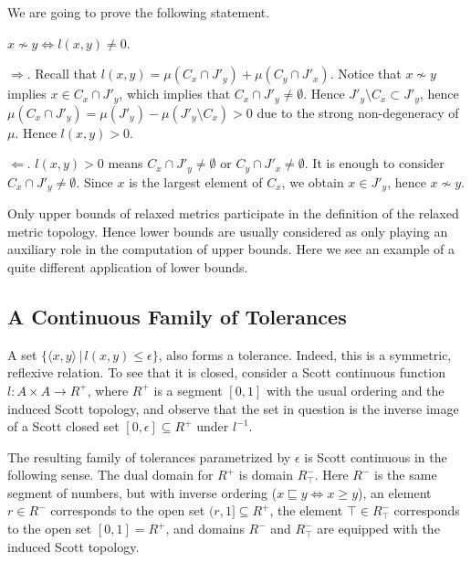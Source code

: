 We are going to prove the following statement.

\begin{theorem}
$x \not\sim y  \Leftrightarrow l(x, y) \neq 0$.
\end{theorem}

\Proof
$\Rightarrow$. Recall that
$l(x, y) = \mu (C_x \cap J'_y) + \mu (C_y \cap J'_x)$.
Notice that
$x \not\sim y$ implies $x \in C_x \cap J'_y$, which implies
that $C_x \cap J'_y \neq \emptyset$. Hence $J'_y \setminus C_x
\subset J'_y$, hence $\mu (C_x \cap J'_y) =
\mu (J'_y) - \mu (J'_y \setminus C_x) > 0$ due to the strong
non-degeneracy of $\mu$. Hence $l(x,y) > 0$.

$\Leftarrow$. $l(x,y) >0$ means $C_x \cap J'_y \neq \emptyset$ or
$C_y \cap J'_x \neq \emptyset$. It is enough to consider
$C_x \cap J'_y \neq \emptyset$. Since $x$ is the largest element
of $C_x$, we obtain $x \in J'_y$, hence $x \not\sim y$.
\eproof

Only upper bounds of relaxed metrics participate in the definition
of the relaxed metric topology. Hence lower bounds are usually considered
as only playing an auxiliary role in the computation of upper bounds.
Here we see an example of a quite different 
application of lower bounds.

\subsection{A Continuous Family of Tolerances}

A set $\{\langle x, y \rangle \,|\, l(x, y) \leq \epsilon\}$,
also forms a tolerance. Indeed, this is a symmetric, reflexive
relation. To see that it is closed, consider a Scott continuous
function $l: A \times A \rightarrow R^{+}$, where $R^{+}$ is
a segment $[0,1]$ with the usual ordering and the induced
Scott topology, and observe that the set in question is
the inverse image of a Scott closed set $[0, \epsilon] \subseteq R^{+}$
under $l^{-1}$.

The resulting family of tolerances parametrized by $\epsilon$ is
Scott continuous in the following sense. The dual domain for
$R^{+}$ is domain $R^{-}_{\top}$. Here $R^{-}$ is the same segment of numbers,
but with inverse ordering ($x \sqsubseteq y \Leftrightarrow x \geq y$),
an element $r \in R^{-}$ corresponds to the open set $(r, 1] \subseteq R^{+}$,
the element $\top \in R^{-}_{\top}$ corresponds to the open set $[0,1] = R^{+}$,
and domains $R^{-}$ and $R^{-}_{\top}$ are equipped with
the induced Scott topology.

